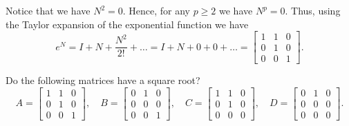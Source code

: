 \documentclass{article}
\begin{document}
\begin{solution}
  Notice that we have $N^2 = 0$.
  Hence, for any $p \ge 2$ we have $N^p = 0$.
  Thus, using the Taylor expansion of the exponential function we have
  \[e^N = I + N + \frac{N^2}{2!} + \ldots = I + N + 0 + 0 + \ldots = \begin{bmatrix} 1 & 1 & 0\\ 0 & 1 & 0\\ 0 & 0 & 1 \end{bmatrix}.\]
\end{solution}

\begin{problem}
  Do the following matrices have a square root?
  \[A = \begin{bmatrix} 1 & 1 & 0\\ 0 & 1 & 0\\ 0 & 0 & 1 \end{bmatrix},\quad B = \begin{bmatrix} 0 & 1 & 0\\ 0 & 0 & 0\\ 0 & 0 & 1 \end{bmatrix}, \quad C = \begin{bmatrix} 1 & 1 & 0\\ 0 & 1 & 0\\ 0 & 0 & 0 \end{bmatrix}, \quad D = \begin{bmatrix} 0 & 1 & 0\\ 0 & 0 & 0\\ 0 & 0 & 0 \end{bmatrix}.\]
\end{problem}
\end{document}
